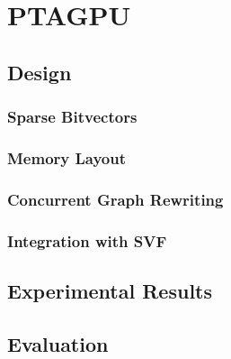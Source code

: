 \chapter{PTAGPU}
\section{Design}
\subsection{Sparse Bitvectors}
\subsection{Memory Layout}
\subsection{Concurrent Graph Rewriting}
\subsection{Integration with SVF}
\section{Experimental Results}
\section{Evaluation}
